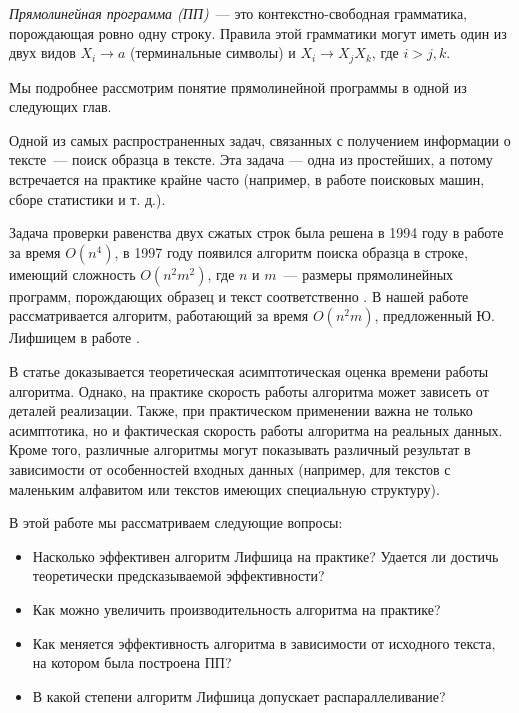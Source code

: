 \documentclass[14pt]{article}
\begin{document}
\emph{Прямолинейная программа (ПП)}~--- это контекстно-свободная грамматика, порождающая ровно одну строку.
Правила этой грамматики могут иметь один из двух видов $X_i \to a$ (терминальные символы) и $X_i \to X_j X_k$, где $i > j, k$.

Мы подробнее рассмотрим понятие прямолинейной программы в одной из следующих глав. 


Одной из самых распространенных задач, связанных с получением информации о тексте~--- поиск образца в тексте.
Эта задача --- одна из простейших, а потому встречается на практике крайне часто (например, в работе поисковых машин, сборе статистики и т. д.). 

Задача проверки равенства двух сжатых строк была решена в 1994 году в работе \cite{1994} за время $O(n^4)$, в 1997 году появился алгоритм поиска образца в строке, имеющий сложность $O(n^2 m^2)$, где $n$ и $m$~--- размеры прямолинейных программ, порождающих образец и текст соответственно \cite{1997}. В нашей работе рассматривается алгоритм, работающий за время $O(n^2 m)$, предложенный Ю. Лифшицем
в работе \cite{Lifshits}.

В статье \cite{Lifshits} доказывается теоретическая асимптотическая оценка времени работы алгоритма.
Однако, на практике скорость работы алгоритма может зависеть от деталей реализации. Также, при практическом применении важна не только асимптотика, но и фактическая скорость работы алгоритма на реальных данных. 
Кроме того, различные алгоритмы могут показывать различный результат в зависимости от особенностей входных данных (например, для текстов с маленьким алфавитом или текстов имеющих специальную структуру). 

В этой работе мы рассматриваем следующие вопросы:
\begin{itemize}
\item Насколько эффективен алгоритм Лифшица на практике? Удается ли достичь теоретически предсказываемой эффективности?
\item Как можно увеличить производительность алгоритма на практике?
\item Как меняется эффективность алгоритма в зависимости от исходного текста, на котором была построена ПП?
\item В какой степени алгоритм Лифшица допускает распараллеливание?
\end{itemize}
\end{document}
